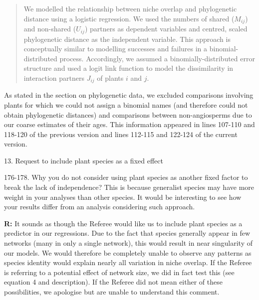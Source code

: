 \documentclass[12pt]{letter}
\newenvironment{refquote}{\bigskip \begin{it}}{\end{it}\smallskip}
\providecommand{\DIFaddbegin}{} %
\providecommand{\DIFaddend}{} %
\newcommand{\DIFaddincludegraphics}[2][]{{\color{blue}\fbox{\DIFOincludegraphics[#1]{#2}}}} %
\DeclareRobustCommand{\DIFaddbegin}{\DIFOaddbegin \let\includegraphics\DIFaddincludegraphics} %
\DeclareRobustCommand{\DIFaddend}{\DIFOaddend \let\includegraphics\DIFOincludegraphics} %
\begin{document}
		\smallskip

		\begin{quotation}

			We modelled the relationship between niche overlap and phylogenetic 
			distance using a logistic regression. We used the numbers of shared 
			($M_{ij}$) and non-shared ($U_{ij}$) partners as dependent variables and 
			centred, scaled phylogenetic distance as the independent variable. This 
			approach is conceptually similar to modelling successes and failures in a 
			binomial-distributed process. Accordingly, we assumed a binomially-distributed error structure and used a logit link function to model the dissimilarity in interaction partners 
			$J_{ij}$ of plants $i$ and $j$.

		\end{quotation}


		As stated in the section on phylogenetic data, we excluded comparisons involving plants for which we could not assign a binomial names (and therefore could not obtain phylogenetic distances) and comparisons between non-angiosperms due to our coarse estimates of their ages. This information appeared in lines 107-110 and 118-120 of the previous version and lines 112-115 and 122-124 of the current version.


	13. Request to include plant species as a fixed effect

		\begin{refquote}
			176-178. Why you do not consider using plant species as another fixed factor to break the lack of independence? This is because generalist species may have more weight in your analyses than other species. It would be interesting to see how your results differ from an analysis considering such approach.
		\end{refquote}


\DIFaddbegin 

		\DIFaddend \textbf{R:} It sounds as though the Referee would like us to include plant species as a predictor in our regressions. Due to the fact that species generally appear in few networks (many in only a single network), this would result in near singularity of our models. We would therefore be completely unable to observe any patterns as species identity would explain nearly all variation in niche overlap. If the Referee is referring to a potential effect of network size, we did in fact test this (see equation 4 and description). If the Referee did not mean either of these possibilities, we apologise but are unable to understand this comment.
\end{document}
